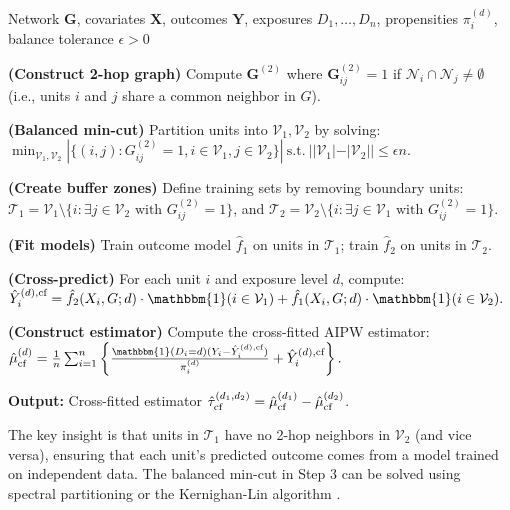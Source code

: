 \documentclass{article}
\theoremstyle{plain}
\theoremstyle{definition}
\theoremstyle{remark}
\newcommand{\bY}{\boldsymbol{Y}}
\newcommand{\bG}{\boldsymbol{G}}
\newcommand{\bX}{\boldsymbol{X}}
\newcommand{\cN}{\mathcal{N}}
\newcommand{\indicator}{\mathbbm{1}}
\newcommand{\sumi}{\sum_{i=1}^n}
\begin{document}
\begin{algorithm}[ht!]
    \caption{Graph-Based Cross-Fitting for Network Interference}
    \label{alg:cross_fitting}
\begin{algorithmic}[1]
     Network $\bG$, covariates $\bX$, outcomes $\bY$, exposures $D_1,\ldots,D_n$, propensities $\pi_i^{(d)}$, balance tolerance $\epsilon > 0$
    
    \STATE \textbf{(Construct 2-hop graph)} Compute $\bG^{(2)}$ where $\bG^{(2)}_{ij} = 1$ if $\cN_i \cap \cN_j \neq \emptyset$ (i.e., units $i$ and $j$ share a common neighbor in $G$).
    
    \STATE \textbf{(Balanced min-cut)} Partition units into $\mathcal{V}_1, \mathcal{V}_2$ by solving:
    $
    \min_{\mathcal{V}_1, \mathcal{V}_2} |\{(i,j) : G^{(2)}_{ij} = 1, i \in \mathcal{V}_1, j \in \mathcal{V}_2\}| ~ \text{s.t.} ~ ||\mathcal{V}_1| - |\mathcal{V}_2|| \leq \epsilon n.
    $
    
    \STATE \textbf{(Create buffer zones)} Define training sets by removing boundary units:
    $\mathcal{T}_1 = \mathcal{V}_1 \setminus \{i : \exists j \in \mathcal{V}_2 \text{ with } G^{(2)}_{ij} = 1\}$, and
    $\mathcal{T}_2 = \mathcal{V}_2 \setminus \{i : \exists j \in \mathcal{V}_1 \text{ with } G^{(2)}_{ij} = 1\}$.
    
    \STATE \textbf{(Fit models)} Train outcome model $\hat{f}_1$ on units in $\mathcal{T}_1$; train $\hat{f}_2$ on units in $\mathcal{T}_2$.
    
    \STATE \textbf{(Cross-predict)} For each unit $i$ and exposure level $d$, compute:
    $
    \hat{Y}_i^{(d),\textup{cf}} = \hat{f}_2(X_i, G; d) \cdot \indicator(i \in \mathcal{V}_1) + \hat{f}_1(X_i, G; d) \cdot \indicator(i \in \mathcal{V}_2).
    $
    
    \STATE \textbf{(Construct estimator)} Compute the cross-fitted AIPW estimator:
    $
    \hat{\mu}^{(d)}_{\textup{cf}} = \frac{1}{n}\sumi \left\{ \frac{\indicator(D_i=d)(Y_i - \hat{Y}_i^{(d),\textup{cf}})}{\pi_i^{(d)}} + \hat{Y}_i^{(d),\textup{cf}} \right\}.
    $
    
    \STATE \textbf{Output:} Cross-fitted estimator $\hat{\tau}^{(d_1,d_2)}_{\textup{cf}} = \hat{\mu}^{(d_1)}_{\textup{cf}} - \hat{\mu}^{(d_2)}_{\textup{cf}}$.
\end{algorithmic}
\end{algorithm}

The key insight is that units in $\mathcal{T}_1$ have no 2-hop neighbors in $\mathcal{V}_2$ (and vice versa), ensuring that each unit's predicted outcome comes from a model trained on independent data. The balanced min-cut in Step 3 can be solved using spectral partitioning \citep{fiedler1973algebraic} or the Kernighan-Lin algorithm \citep{kernighan1970efficient}.  
\end{document}
